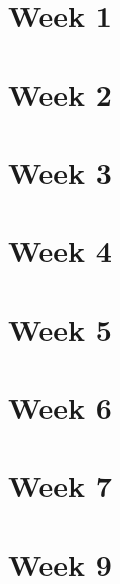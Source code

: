 \documentclass[letterpaper,12pt]{article}
\begin{document}
	
	
\renewcommand{\week}{Week 1}
\section*{\week}

\clearpage
	
\renewcommand{\week}{Week 2}
\section*{\week}

\clearpage
	
\renewcommand{\week}{Week 3}
\section*{\week}

\clearpage
	
\renewcommand{\week}{Week 4}
\section*{\week}

\clearpage
	
\renewcommand{\week}{Week 5}
\section*{\week}

\clearpage
	
\renewcommand{\week}{Week 6}
\section*{\week}

\clearpage
	
\renewcommand{\week}{Week 7}
\section*{\week}

\clearpage
	
	
\renewcommand{\week}{Week 9}
\section*{\week}

\clearpage
	
\renewcommand{\week}{Week 10}
\end{document}
